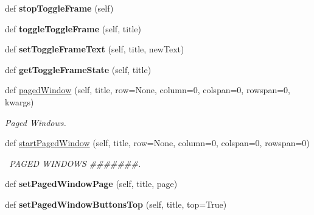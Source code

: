 \begin{DoxyCompactItemize}
\mbox{\label{classappjar_1_1gui_a209f61e89cf1c8ca8dab5a19c48ad4e0}} 
def {\bfseries stop\+Toggle\+Frame} (self)
\item 
\mbox{\label{classappjar_1_1gui_af6979ad59106b835f53cf0c7f2913de6}} 
def {\bfseries toggle\+Toggle\+Frame} (self, title)
\item 
\mbox{\label{classappjar_1_1gui_a9605fa60fecbb8dd86db6d950f766864}} 
def {\bfseries set\+Toggle\+Frame\+Text} (self, title, new\+Text)
\item 
\mbox{\label{classappjar_1_1gui_ae5101e3d38337bad2db424b80830ce34}} 
def {\bfseries get\+Toggle\+Frame\+State} (self, title)
\item 
\mbox{\label{classappjar_1_1gui_ad9c1e4a9b6f7f3e79fbc64ad86e292ec}} 
def \hyperlink{classappjar_1_1gui_ad9c1e4a9b6f7f3e79fbc64ad86e292ec}{paged\+Window} (self, title, row=None, column=0, colspan=0, rowspan=0, kwargs)
\begin{DoxyCompactList}\small\item\em Paged Windows. \end{DoxyCompactList}\item 
\mbox{\label{classappjar_1_1gui_a7da015ca9ad525112fba0cd91f4feb40}} 
def \hyperlink{classappjar_1_1gui_a7da015ca9ad525112fba0cd91f4feb40}{start\+Paged\+Window} (self, title, row=None, column=0, colspan=0, rowspan=0)
\begin{DoxyCompactList}\small\item\em  \+P\+A\+G\+ED W\+I\+N\+D\+O\+WS \#\#\#\#\#\#\#. \end{DoxyCompactList}\item 
\mbox{\label{classappjar_1_1gui_aee32c73ed84067cf1fbf172d38315070}} 
def {\bfseries set\+Paged\+Window\+Page} (self, title, page)
\item 
\mbox{\label{classappjar_1_1gui_a49892352eeffd04185ee686c2ff3a95c}} 
def {\bfseries set\+Paged\+Window\+Buttons\+Top} (self, title, top=True)
\item 
\mbox{\label{classappjar_1_1gui_a1e62f2f01676e56f652404dddc5e53ca}} 

\end{DoxyCompactItemize}
